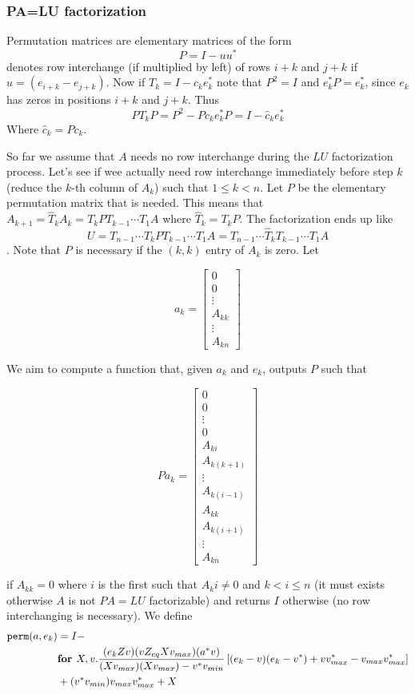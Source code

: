 \subsubsection{PA=LU factorization}

Permutation matrices are elementary matrices of the form $$P=I-uu^*$$ denotes row interchange (if multiplied by left) of rows $i+k$ and $j+k$ if $u=(e_{i+k}-e_{j+k})$. Now if $T_{k} = I-c_ke_k^*$ note that $P^2=I$ and $e_k^*P=e_k^*$, since $e_{k}$ has zeros in positions $i+k$ and $j+k$. Thus $$PT_kP=P^2-Pc_ke_k^*P=I-\widehat{c}_ke_k^*$$ Where $\widehat{c}_k=Pc_k$.

So far we assume that $A$ needs no row interchange during the $LU$ factorization process. Let's see if wee actually need row interchange immediately before step $k$ (reduce the $k$-th column of $A_{k}$) such that $1 \leq k < n$. Let $P$ be the elementary permutation matrix that is needed. This means that $A_{k+1}=\widehat{T}_kA_k=T_kPT_{k-1}\cdots T_1A$ where $\widehat{T}_k=T_{k}P$. The factorization ends up like $$U=T_{n-1}\cdots T_{k}PT_{k-1}\cdots T_1A = T_{n-1}\cdots \widehat{T}_{k}T_{k-1}\cdots T_1A$$. Note that $P$ is necessary if the $(k,k)$ entry of $A_{k}$ is zero. Let 

\[
a_k = 
\begin{bmatrix}
    0 \\
    0 \\
    \vdots \\
    A_{kk} \\
     \vdots \\
    A_{kn}
\end{bmatrix}
\]

We aim to compute a function that, given $a_k$ and $e_k$, outputs $P$ such that

\[
Pa_k = 
\begin{bmatrix}
    0 \\
    0 \\
    \vdots \\
    0 \\
    A_{ki} \\
    A_{k(k+1)}\\
    \vdots \\
    A_{k(i-1)} \\
    A_{kk} \\
    A_{k(i+1)} \\
    \vdots \\
    A_{kn}
\end{bmatrix}
\]

if $A_{kk}=0$ where $i$ is the first such that $A_ki\neq 0$ and $k<i\leq n$ (it must exists otherwise $A$ is not $PA=LU$ factorizable) and returns $I$ otherwise (no row interchanging is necessary). We define
\begin{align*}
\texttt{perm}(a,e_k)&=I - \\
 &\textbf{for } X,v. \dfrac{(e_kZv)(vZ_{eq}Xv_{max})(a^*v)}{(Xv_{max})(Xv_{max})-v^*v_{min}}\left[ (e_k-v)(e_k-v^*)+vv_{max}^*-v_{max}v_{max}^*\right] \\
 & + (v^*v_{min})v_{max}v_{max}^* + X
\end{align*}

